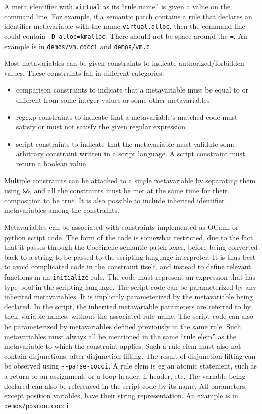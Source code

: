 A meta identifier with {\tt virtual} as its ``rule name'' is given a value on
the command line. For example, if a semantic patch contains a rule that
declares an identifier metavariable with the name {\tt virtual.alloc}, then the
command line could contain {\tt -D alloc=kmalloc}. There should not be space
around the {\tt =}. An example is in {\tt demos/vm.cocci} and {\tt demos/vm.c}.

Most metavariables can be given constraints to indicate authorized/forbidden
values. These constraints fall in different categories:
\begin{itemize}
  \item comparison constraints to indicate that a metavariable must be equal to
    or different from some integer values or some other metavariables
  \item regexp constraints to indicate that a metavariable's matched code must
    satisfy or must not satisfy the given regular expression
  \item script constraints to indicate that the metavariable must validate some
    arbitrary constraint written in a script language. A script constraint must
    return a boolean value
\end{itemize}
Multiple constraints can be attached to a single metavariable by separating
them using {\tt \&\&}, and all the constraints must be met at the same time for
their composition to be true.
It is also possible to include inherited identifier metavariables among the
constraints.

Metavariables can be associated with constraints implemented as OCaml or python
script code. The form of the code is somewhat restricted, due to the fact that
it passes through the Coccinelle semantic patch lexer, before being converted
back to a string to be passed to the scripting language interpreter. It is thus
best to avoid complicated code in the constraint itself, and instead to define
relevant functions in an {\tt initialize} rule. The code must represent an
expression that has type bool in the scripting language. The script code can be
parameterized by any inherited metavariables. It is implicitly parameterized by
the metavariable being declared. In the script, the inherited metavariable
parameters are referred to by their variable names, without the associated rule
name. The script code can also be parameterized by metavariables defined
previously in the same rule. Such metavariables must always all be mentioned in
the same ``rule elem'' as the metavariable to which the constraint applies. Such
a rule elem must also not contain disjunctions, after disjunction lifting. The
result of disjunction lifting can be observed using {\tt -{}-parse-cocci}. A
rule elem is eg an atomic statement, such as a return or an assignment, or a
loop header, if header, etc. The variable being declared can also be referenced
in the script code by its name. All parameters, except position variables, have
their string representation. An example is in {\tt demos/poscon.cocci}.

